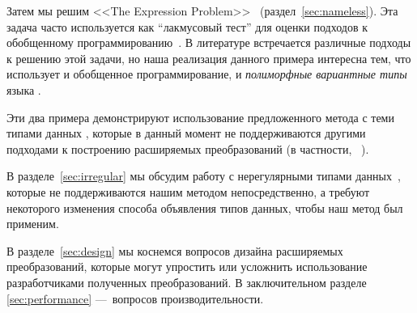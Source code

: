 Затем мы решим <<The Expression Problem>>~\cite{ExpressionProblem}
 (раздел~\ref{sec:nameless}). Эта задача часто используется как ``лакмусовый тест'' для оценки подходов к обобщенному программированию~\cite{ObjectAlgebras,ALaCarte}. В литературе встречается различные подходы к решению этой задачи, но наша реализация данного примера интересна тем, что использует  и обобщенное программирование, и \emph{полиморфные вариантные типы} языка \OCaml{}.

Эти два примера демонстрируют использование предложенного метода с теми типами данных \OCaml{}, которые в данный момент не поддерживаются другими подходами к построению расширяемых преобразований (в частности, \visitors~\cite{Visitors}). 


В разделе~\ref{sec:irregular} мы обсудим работу с нерегулярными типами данных~\cite{irregular}, которые не поддерживаются нашим методом непосредственно, а требуют некоторого изменения способа объявления типов данных, чтобы наш метод был применим. %



В разделе~\ref{sec:design} мы коснемся вопросов дизайна расширяемых преобразований, которые могут упростить или усложнить использование  разработчиками полученных преобразований. В заключительном разделе \ref{sec:performance} ---~вопросов производительности.


